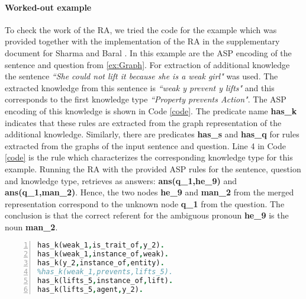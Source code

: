 \paragraph{Worked-out example} To check the work of the RA, we tried the code for the example which was provided together with the implementation of the RA in the supplementary document for Sharma and Baral \cite{2018CommonsenseKT}. In this example are the ASP encoding of the sentence and question from \ref{ex:Graph}.
For extraction of additional knowledge the sentence \textit{``She could not lift it because she is a weak girl"} was used. The extracted knowledge from this sentence is \textit{``weak y prevent y lifts"} and this corresponds to the first knowledge type \textit{``Property prevents Action"}. The ASP encoding of this knowledge is shown in Code \ref{code}. The predicate name \textbf{has\_k} indicates that these rules are extracted from the graph representation of the additional knowledge. Similarly, there are predicates \textbf{has\_s} and \textbf{has\_q} for rules extracted from the graphs of the input sentence and question. Line 4 in Code \ref{code} is the rule which characterizes the corresponding knowledge type for this example. Running the RA with the provided ASP rules for the sentence, question and knowledge type, retrieves as answers: \textbf{ans(q\_1,he\_9)} and \textbf{ans(q\_1,man\_2)}. Hence, the two nodes \textbf{he\_9} and \textbf{man\_2} from the merged representation correspond to the unknown node \textbf{q\_1} from the question. The conclusion is that the correct referent for the ambiguous pronoun \textbf{he\_9} is the noun \textbf{man\_2}. 


\begin{lstlisting}[language = Prolog, style=SC, caption={``weak y prevents y lifts"},label=code,numbers=left,
numberstyle=\tiny ]
has_k(weak_1,is_trait_of,y_2).
has_k(weak_1,instance_of,weak).
has_k(y_2,instance_of,entity).
%has_k(weak_1,prevents,lifts_5).
has_k(lifts_5,instance_of,lift).
has_k(lifts_5,agent,y_2).
\end{lstlisting}


